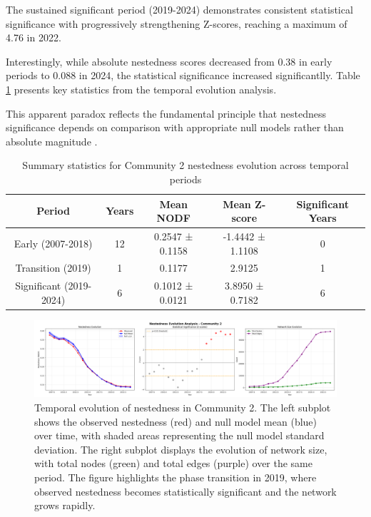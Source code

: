 The sustained significant period (2019-2024) demonstrates consistent statistical significance with progressively strengthening Z-scores, reaching a maximum of 4.76 in 2022. 

Interestingly, while absolute nestedness scores decreased from 0.38 in early periods to 0.088 in 2024, the statistical significance increased significantlly. Table \ref{tab:nestedness_evolution_summary} presents key statistics from the temporal evolution analysis.

This apparent paradox reflects the fundamental principle that nestedness significance depends on comparison with appropriate null models rather than absolute magnitude \cite{Mariani2019}.

\begin{table}[htbp]
\hspace*{-1cm}\centering
\begin{tabular}{|c|c|c|c|c|}
\hline
\textbf{Period} & \textbf{Years} & \textbf{Mean NODF} & \textbf{Mean Z-score} & \textbf{Significant Years} \\
\hline
Early (2007-2018) & 12 & 0.2547 ± 0.1158 & -1.4442 ± 1.1108 & 0 \\
Transition (2019) & 1 & 0.1177 & 2.9125 & 1 \\
Significant (2019-2024) & 6 & 0.1012 ± 0.0121 & 3.8950 ± 0.7182 & 6 \\
\hline
\end{tabular}
\caption{Summary statistics for Community 2 nestedness evolution across temporal periods}
\label{tab:nestedness_evolution_summary}
\end{table}

\begin{figure}[htbp]
\hspace*{-1cm}\centering
\includegraphics[width=1.2\textwidth]{./assets/observed-vs-null-model.png}
\caption{Temporal evolution of nestedness in Community 2. The left subplot shows the observed nestedness (red) and null model mean (blue) over time, with shaded areas representing the null model standard deviation. The right subplot displays the evolution of network size, with total nodes (green) and total edges (purple) over the same period. The figure highlights the phase transition in 2019, where observed nestedness becomes statistically significant and the network grows rapidly.}
\label{fig:observed_vs_null_model}
\end{figure}

